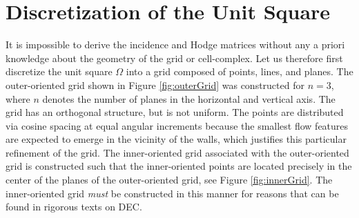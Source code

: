 \section{Discretization of the Unit Square}
\label{sec:discretization}

It is impossible to derive the incidence and Hodge matrices without any a priori knowledge about the geometry of the grid or cell-complex. Let us therefore first discretize the unit square $\Omega$ into a grid composed of points, lines, and planes. The outer-oriented grid shown in Figure \ref{fig:outerGrid} was constructed for $n = 3$, where $n$ denotes the number of planes in the horizontal and vertical axis. The grid has an orthogonal structure, but is not uniform. The points are distributed via cosine spacing at equal angular increments because the smallest flow features are expected to emerge in the vicinity of the walls, which justifies this particular refinement of the grid. The inner-oriented grid associated with the outer-oriented grid is constructed such that the inner-oriented points are located precisely in the center of the planes of the outer-oriented grid, see Figure \ref{fig:innerGrid}. The inner-oriented grid \emph{must} be constructed in this manner for reasons that can be found in rigorous texts on DEC.


